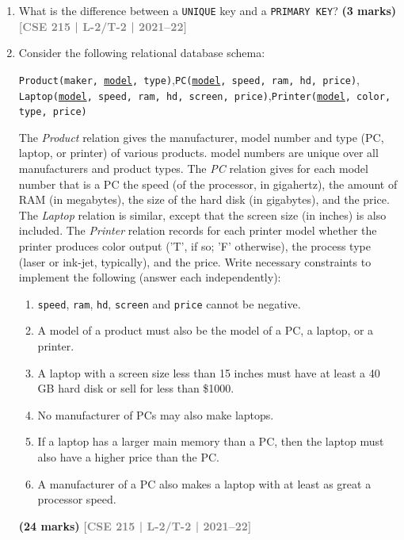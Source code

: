 \documentclass[12pt,a3paper]{article}
\newcommand{\yr}[1]{\hfill\textcolor{gray}{\small\textbf{[#1]}}}
\newcommand{\mk}[1]{\textcolor{orange!70!black}{\small\textbf{(#1 marks)}}}
\begin{document}
\begin{enumerate}
\item What is the difference between a \texttt{UNIQUE} key and a \texttt{PRIMARY KEY}?
\mk{3} \yr{CSE 215 | L-2/T-2 | 2021--22}

\item Consider the following relational database schema:
\begin{center}
\texttt{Product(maker, \underline{model}, type)},\quad \texttt{PC(\underline{model}, speed, ram, hd, price)},\\
\texttt{Laptop(\underline{model}, speed, ram, hd, screen, price)},\quad \texttt{Printer(\underline{model}, color, type, price)}
\end{center}
The \textit{Product} relation gives the manufacturer, model number and type (PC, laptop, or printer) of various products. model numbers are unique over all manufacturers and product types. The \textit{PC} relation gives for each model number that is a PC the speed (of the processor, in gigahertz), the amount of RAM (in megabytes), the size of the hard disk (in gigabytes), and the price. The \textit{Laptop} relation is similar, except that the screen size (in inches) is also included. The \textit{Printer} relation records for each printer model whether the printer produces color output ('T', if so; 'F' otherwise), the process type (laser or ink-jet, typically), and the price.
Write necessary constraints to implement the following (answer each independently):
\begin{enumerate}
  \item \texttt{speed}, \texttt{ram}, \texttt{hd}, \texttt{screen} and \texttt{price} cannot be negative.
  \item A model of a product must also be the model of a PC, a laptop, or a printer.
  \item A laptop with a screen size less than 15 inches must have at least a 40 GB hard disk or sell for less than \$1000.
  \item No manufacturer of PCs may also make laptops.
  \item If a laptop has a larger main memory than a PC, then the laptop must also have a higher price than the PC.
  \item A manufacturer of a PC also makes a laptop with at least as great a processor speed.
\end{enumerate}
\mk{24} \yr{CSE 215 | L-2/T-2 | 2021--22}


\end{enumerate}
\end{document}
